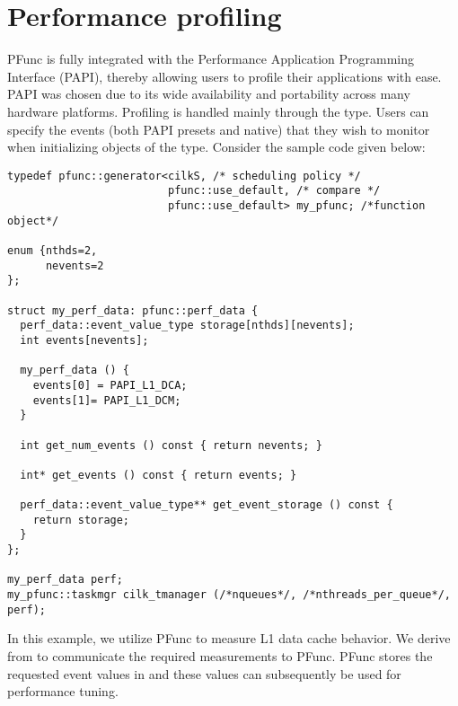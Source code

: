 \section{Performance profiling}
\label{sec:perf}

PFunc is fully integrated with the Performance Application Programming
Interface (PAPI), thereby allowing users to profile their
applications with ease. PAPI was chosen due to its wide availability and
portability across many hardware platforms. Profiling is handled mainly through
the  type. Users can specify the events (both PAPI presets and
native) that they wish to monitor when initializing objects of the
 type. Consider the sample code given below:

\begin{lstlisting}
typedef pfunc::generator<cilkS, /* scheduling policy */
                         pfunc::use_default, /* compare */
                         pfunc::use_default> my_pfunc; /*function object*/

enum {nthds=2,
      nevents=2
};

struct my_perf_data: pfunc::perf_data {
  perf_data::event_value_type storage[nthds][nevents];
  int events[nevents];

  my_perf_data () {
    events[0] = PAPI_L1_DCA; 
    events[1]= PAPI_L1_DCM;
  }

  int get_num_events () const { return nevents; }

  int* get_events () const { return events; }

  perf_data::event_value_type** get_event_storage () const {
    return storage; 
  }
};

my_perf_data perf;
my_pfunc::taskmgr cilk_tmanager (/*nqueues*/, /*nthreads_per_queue*/, perf);
\end{lstlisting}

In this example, we utilize PFunc to measure L1 data cache behavior. We
derive from  to communicate the required
measurements to PFunc. PFunc stores the requested event values in
 and these values can subsequently be used for performance
tuning.
